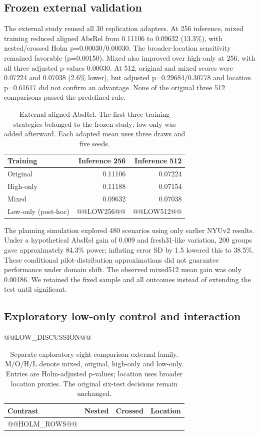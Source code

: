 \documentclass[10pt,twocolumn,letterpaper]{article}
\begin{document}
\subsection{Frozen external validation}
The external study reused all 30 replication adapters. At 256 inference, mixed training reduced aligned AbsRel from 0.11106 to 0.09632 (13.3\%), with nested/crossed Holm p=0.00030/0.00030. The broader-location sensitivity remained favorable (p=0.00150). Mixed also improved over high-only at 256, with all three adjusted p-values 0.00030. At 512, original and mixed scores were 0.07224 and 0.07038 (2.6\% lower), but adjusted p=0.29684/0.30778 and location p=0.61617 did not confirm an advantage. None of the original three 512 comparisons passed the predefined rule.

\begin{table}[t]
\centering\small
\caption{External aligned AbsRel. The first three training strategies belonged to the frozen study; low-only was added afterward. Each adapted mean uses three draws and five seeds.}
\label{tab:external}
\begin{tabular}{lrr}\toprule
Training & Inference 256 & Inference 512\\\midrule
Original & 0.11106 & 0.07224\\
High-only & 0.11188 & 0.07154\\
Mixed & 0.09632 & 0.07038\\
Low-only (post-hoc) & @@LOW256@@ & @@LOW512@@\\\bottomrule
\end{tabular}
\end{table}

The planning simulation explored 480 scenarios using only earlier NYUv2 results. Under a hypothetical AbsRel gain of 0.009 and fresh31-like variation, 200 groups gave approximately 84.3\% power; inflating error SD by 1.5 lowered this to 38.5\%. These conditional pilot-distribution approximations did not guarantee performance under domain shift. The observed mixed512 mean gain was only 0.00186. We retained the fixed sample and all outcomes instead of extending the test until significant.

\subsection{Exploratory low-only control and interaction}
@@LOW_DISCUSSION@@

\begin{table}[t]
\centering\small
\caption{Separate exploratory eight-comparison external family. M/O/H/L denote mixed, original, high-only and low-only. Entries are Holm-adjusted p-values; location uses broader location proxies. The original six-test decisions remain unchanged.}
\label{tab:exploratory}
\begin{tabular}{lrrr}\toprule
Contrast & Nested & Crossed & Location\\\midrule
@@HOLM_ROWS@@
\bottomrule\end{tabular}
\end{table}
\end{document}
